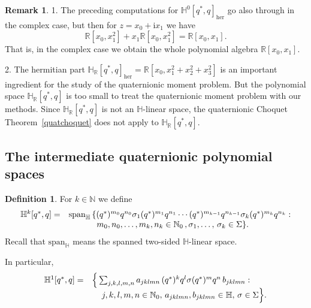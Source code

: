 \documentclass[11pt,a4paper]{amsart}
\theoremstyle{definition}
\newtheorem{definition}[theorem]{Definition}
\newtheorem{remark}[theorem]{Remark}
\begin{document}
\begin{remark}
\label{rem4.6}
1. The preceding computations for
$ \mathbb{H}^{0}[q^{*}, q]_{\mathrm{her}}$ go also through in the complex
case, but then for $z=x_{0}+\mathrm{i}x_{1}$ we have
%
\begin{equation*}
\mathbb{R}[x_{0},x_{1}^{2}]+ x_{1}\mathbb{R}[x_{0},x_{1}^{2}]=
\mathbb{R}[x_{0},x_{1}].
\end{equation*}
%
That is, in the complex case we obtain the whole polynomial algebra
$\mathbb{R}[x_{0},x_{1}]$.

2. The hermitian part
$\mathbb{H}_{\mathbb{R}}[q^{*}, q]_{\mathrm{her}} =\mathbb{R}[x_{0},x_{1}^{2}+x_{2}^{2}+x_{3}^{2}]$
is an important ingredient for the study of the quaternionic moment problem.
But the polynomial space $\mathbb{H}_{\mathbb R}[q^{*}, q]$ is too small
to treat the quaternionic moment problem with our methods. Since
$\mathbb{H}_{\mathbb R}[q^{*}, q]$ is not an $\mathbb{H}$-linear space,
the quaternionic Choquet Theorem~\ref{quatchoquet} does not apply to
$\mathbb{H}_{\mathbb R}[q^{*}, q]$.
\end{remark}
%

\subsection{The intermediate quaternionic polynomial spaces}
\label{sec4.2}

\begin{definition}%
\label{defihk}
For $k\in \mathbb{N}$ we define
%
\begin{equation*}
%
\begin{array}{r@{\quad}l}
\mathbb{H}^{k}[q^{*}, q] =& \mathrm{span}_{\mathbb{H}} \, \{(q^{*})^{m_{0}}
q^{n_{0}} \sigma _{1}(q^{*})^{m_{1}} q^{n_{1}}\cdots (q^{*})^{m_{k-1}}
q^{n_{k-1}}\sigma _{k}(q^{*})^{m_{k}} q^{n_{k}}:
\\
& \quad \quad \quad \, \, m_{0},n_{0},\dots ,m_{k},n_{k}\in
\mathbb{N}_{0}\,, \sigma _{1},\dots ,\,\sigma _{k}\in \Sigma \}.
\end{array}
%
\end{equation*}
%
Recall that $\mathrm{{span}_{\mathbb{H}}}$ means the spanned two-sided
$\mathbb{H}$-linear space.
\end{definition}
%
In particular,
%
\begin{equation*}
%
\begin{array}{l@{\quad}l}
\mathbb{H}^{1}[q^{*}, q] = & \Big\{ \sum _{j,k,l,m,n} a_{jklmn}\, (q^{*})^{k}
q^{l} \sigma (q^{*})^{m} q^{n}\, b_{jklmn}:
\\
& \quad \, j,k,l,m, n \in \mathbb{N}_{0}, \, a_{jklmn}, b_{jklmn}\in
\mathbb{H},\, \sigma \in \Sigma \Big\}.
\end{array}
%
\end{equation*}
\end{document}
